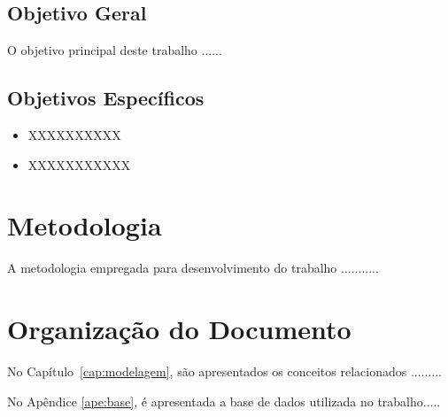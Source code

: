 \subsection{Objetivo Geral}
\label{sec:objgeral}
	O objetivo principal deste trabalho ......


\subsection{Objetivos Específicos}
\label{sec:objespecificos}

	\begin{itemize}
		\item XXXXXXXXXX
	
		\item XXXXXXXXXXX
	
	\end{itemize}



\section{Metodologia}
\label{sec:metodologia}

A metodologia empregada para desenvolvimento do trabalho ...........\\


\section{Organização do Documento}
\label{sec:organizacao}

No Capítulo~\ref{cap:modelagem}, são apresentados os conceitos relacionados .........

No Apêndice \ref{ape:base}, é apresentada a base de dados utilizada no trabalho.....
